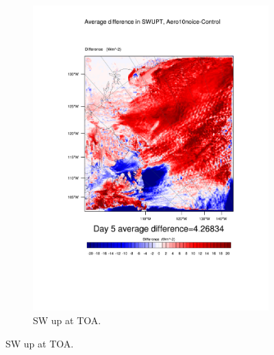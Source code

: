 \begin{figure}
\begin{subfigure}{0.48\textwidth}
		\includegraphics[width=\textwidth]{results/aero10ni/diff_Aero10NoIce_SWUPT_Day5.pdf}
		\caption{SW up at TOA.}
		\label{subfig:swup_r4Day5}
	\end{subfigure}
	

\end{figure}
